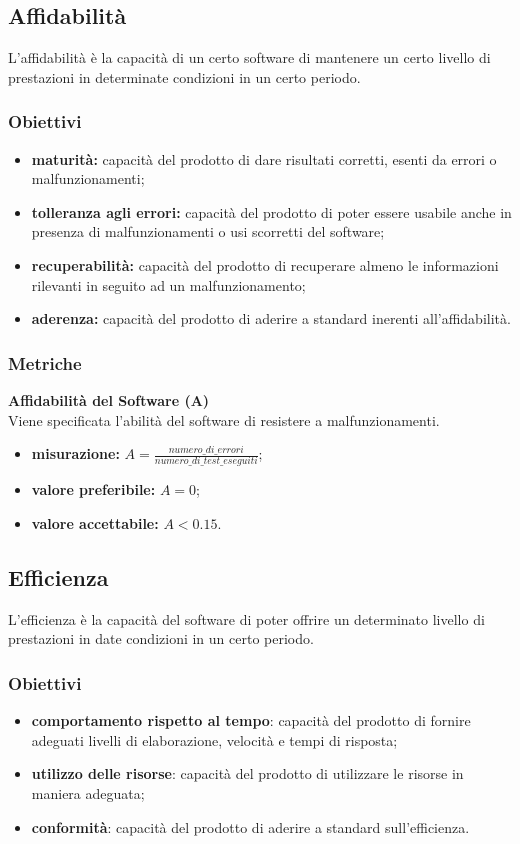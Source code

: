 \subsection{Affidabilità}
L'affidabilità è la capacità di un certo software di mantenere un certo livello di prestazioni in determinate condizioni in un certo periodo.
\subsubsection{Obiettivi}
\begin{itemize}
	\item \textbf{maturità:} capacità del prodotto di dare risultati corretti, esenti da errori o malfunzionamenti;
	\item \textbf{tolleranza agli errori:} capacità del prodotto di poter essere usabile anche in presenza di malfunzionamenti o usi scorretti del software;
	\item \textbf{recuperabilità:} capacità del prodotto di recuperare almeno le informazioni rilevanti in seguito ad un malfunzionamento;
	\item \textbf{aderenza:} capacità del prodotto di aderire a standard inerenti all'affidabilità.
\end{itemize}
\subsubsection{Metriche}
\textbf{Affidabilità del Software (A)}\\
Viene specificata l'abilità del software di resistere a malfunzionamenti.
\begin{itemize}
	\item \textbf{misurazione:} $A = \frac{numero\_di\_errori}{numero\_di\_test\_eseguiti}$;
	\item \textbf{valore preferibile:} $A = 0$;
	\item \textbf{valore accettabile:} $A < 0.15$.
\end{itemize}

\subsection{Efficienza}
L'efficienza è la capacità del software di poter offrire un determinato livello di prestazioni in date condizioni in un certo periodo.
\subsubsection{Obiettivi}
\begin{itemize}
	\item \textbf{comportamento rispetto al tempo}: capacità del prodotto di fornire adeguati livelli di elaborazione, velocità e tempi di risposta;
	\item \textbf{utilizzo delle risorse}: capacità del prodotto di utilizzare le risorse in maniera adeguata;
	\item \textbf{conformità}: capacità del prodotto di aderire a standard sull'efficienza.
\end{itemize}
